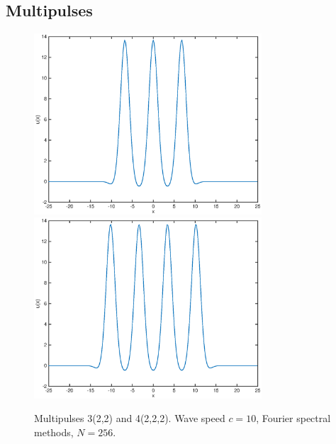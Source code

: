\documentclass[12pt]{article}
\begin{document}
\subsection{Multipulses}
\begin{figure}[H]
	\includegraphics[width=8.5cm]{four10um1_3}
	\includegraphics[width=8.5cm]{four10um1_4.eps}
	\caption{Multipulses 3(2,2) and 4(2,2,2). Wave speed $c = 10$, Fourier spectral methods, $N = 256$. }
\end{figure}
\end{document}
